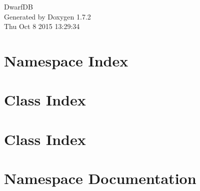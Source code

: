\documentclass[a4paper]{book}
\begin{document}
\hypersetup{pageanchor=false}
\begin{titlepage}
\vspace*{7cm}
\begin{center}
{\Large DwarfDB }\\
\vspace*{1cm}
{\large Generated by Doxygen 1.7.2}\\
\vspace*{0.5cm}
{\small Thu Oct 8 2015 13:29:34}\\
\end{center}
\end{titlepage}
\clearemptydoublepage
{}
\tableofcontents
\clearemptydoublepage
{}
\hypersetup{pageanchor=true}
\chapter{Namespace Index}

\chapter{Class Index}

\chapter{Class Index}

\chapter{Namespace Documentation}













\end{document}

